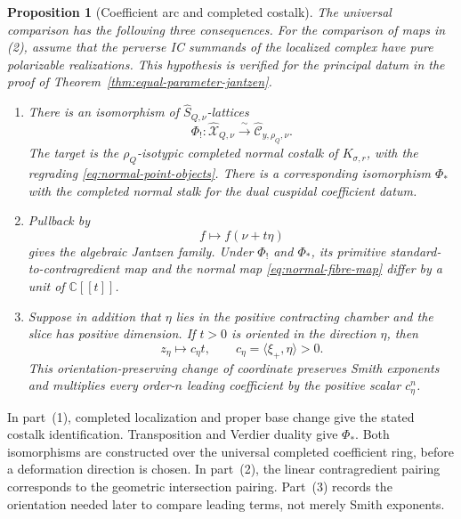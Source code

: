 \documentclass[10pt,a4paper]{amsart}
\newtheorem{proposition}[theorem]{Proposition}
\newcommand{\C}{\mathbb C}
\newcommand{\A}{\C[[t]]}
\begin{document}
\begin{proposition}[Coefficient arc and completed costalk]
\label{prop:general-coefficient-arc}
The universal comparison has the following three consequences.
For the comparison of maps in \textup{(2)}, assume that the perverse IC
summands of the localized complex have pure polarizable realizations.
This hypothesis is verified for the principal datum in the proof of
Theorem~\ref{thm:equal-parameter-jantzen}.
\begin{enumerate}
\item There is an isomorphism of $\widehat S_{Q,\nu}$-lattices
\begin{equation}\label{eq:universal-coefficient-family}
 \Phi_!: \widehat{\mathcal X}_{Q,\nu}
 \xrightarrow{\ \sim\ }
 \widehat{\mathcal C}_{y,\rho_Q,\nu}.
\end{equation}
The target is the $\rho_Q$-isotypic completed normal costalk of
$K_{\sigma,r}$, with the regrading \eqref{eq:normal-point-objects}.
There is a corresponding isomorphism $\Phi_*$ with the completed
normal stalk for the dual cuspidal coefficient datum.

\item Pullback by
\[
 f\longmapsto f(\nu+t\eta)
\]
gives the algebraic Jantzen family.  Under $\Phi_!$ and $\Phi_*$, its
primitive standard-to-contragredient map and the normal map
\eqref{eq:normal-fibre-map} differ by a unit of $\A$.

\item Suppose in addition that $\eta$ lies in the positive contracting
chamber and the slice has positive dimension.  If $t>0$ is oriented in the direction $\eta$, then
\begin{equation}\label{eq:positive-coefficient-arc}
 z_\eta\longmapsto c_\eta t,
 \qquad c_\eta=\langle\xi_+,\eta\rangle>0.
\end{equation}
This orientation-preserving change of coordinate preserves Smith exponents
and multiplies every order-$n$ leading coefficient by the positive scalar
$c_\eta^n$.
\end{enumerate}
\end{proposition}

In part~(1), completed localization and proper base change give the stated
costalk identification.  Transposition and Verdier duality give $\Phi_*$.
Both isomorphisms are constructed over the universal completed coefficient
ring, before a deformation direction is chosen.  In part~(2), the linear
contragredient pairing corresponds to the geometric intersection pairing.
Part~(3) records the orientation needed later to compare leading terms, not
merely Smith exponents.
\end{document}
